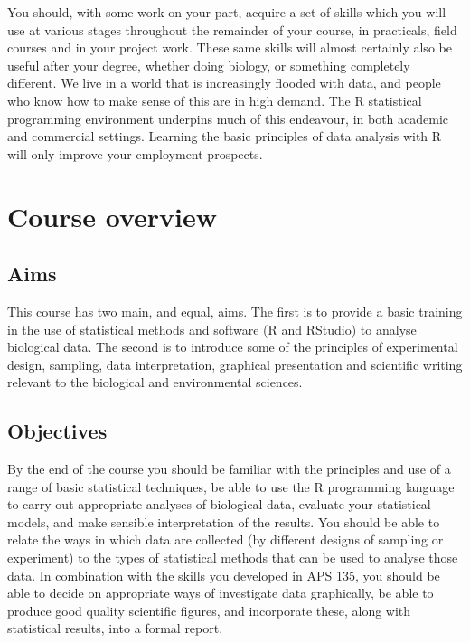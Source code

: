 \documentclass[]{book}
\begin{document}
You should, with some work on your part, acquire a set of skills which
you will use at various stages throughout the remainder of your course,
in practicals, field courses and in your project work. These same skills
will almost certainly also be useful after your degree, whether doing
biology, or something completely different. We live in a world that is
increasingly flooded with data, and people who know how to make sense of
this are in high demand. The R statistical programming environment
underpins much of this endeavour, in both academic and commercial
settings. Learning the basic principles of data analysis with R will
only improve your employment prospects.

\section{Course overview}\label{overview}

\subsection{Aims}\label{aims}

This course has two main, and equal, aims. The first is to provide a
basic training in the use of statistical methods and software (R and
RStudio) to analyse biological data. The second is to introduce some of
the principles of experimental design, sampling, data interpretation,
graphical presentation and scientific writing relevant to the biological
and environmental sciences.

\subsection{Objectives}\label{objectives}

By the end of the course you should be familiar with the principles and
use of a range of basic statistical techniques, be able to use the R
programming language to carry out appropriate analyses of biological
data, evaluate your statistical models, and make sensible interpretation
of the results. You should be able to relate the ways in which data are
collected (by different designs of sampling or experiment) to the types
of statistical methods that can be used to analyse those data. In
combination with the skills you developed in
\href{https://www.shef.ac.uk/aps/currentug/level1/aps135}{APS 135}, you
should be able to decide on appropriate ways of investigate data
graphically, be able to produce good quality scientific figures, and
incorporate these, along with statistical results, into a formal report.
\end{document}
